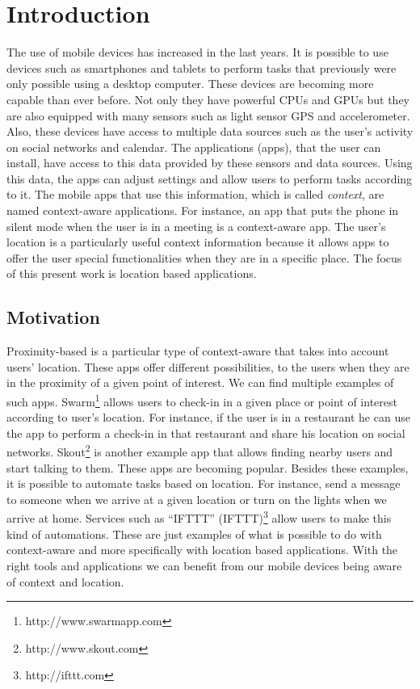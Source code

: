 
\chapter{Introduction}
\label{chapter:introduction}
The use of mobile devices has increased in the last years.
It is possible to use devices such as smartphones and tablets to perform tasks that previously were only possible using a desktop computer.
These devices are becoming more capable than ever before.
Not only they have powerful \glspl{CPU} and \glspl{GPU} but they are also equipped with many sensors such as light sensor \gls{GPS} and accelerometer.
Also, these devices have access to multiple data sources such as
the user's activity on social networks and calendar.
The applications (apps), that the user can install, have access to this data provided by these sensors and data sources.
Using this data, the apps can adjust settings and allow users to perform tasks according to it.
The mobile apps that use this information, which is called \emph{context}, are named context-aware applications.
For instance, an app that puts the phone in silent mode when the user is in a meeting is a context-aware app.
The user's location is a particularly useful context information because it allows apps to offer the user special functionalities when they are in a specific place.
The focus of this present work is location based applications.

\section{Motivation}
\label{sec:introduction_motivation}
Proximity-based is a particular type of context-aware that takes into account users' location.
These apps offer different possibilities, to the users when they are in the proximity of a given point of interest.
We can find multiple examples of such apps.
Swarm\footnote{http://www.swarmapp.com} allows users to check-in in a given place or point of interest according to user's location.
For instance, if the user is in a restaurant he can use the app to perform a check-in in that restaurant and share his location on social networks.
Skout\footnote{http://www.skout.com}
is another example app that allows finding nearby users and start talking to them.
These apps are becoming popular.
Besides these examples, it is possible to automate tasks based on location.
For instance, send a message to someone when we arrive at a given location or turn on the lights when we arrive at home.
Services such as ``\acrlong{IFTTT}'' (\acrshort{IFTTT})\footnote{http://ifttt.com} allow users to make this kind of automations.
These are just examples of what is possible to do with context-aware and more specifically with location based applications.
With the right tools and applications we can benefit from our mobile devices being aware of context and location.

